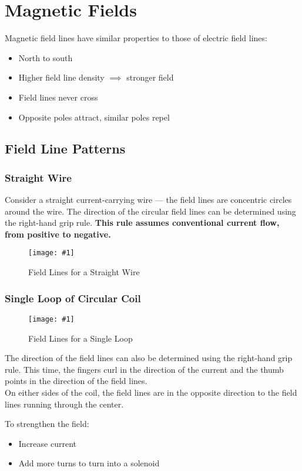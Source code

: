 \documentclass[a4paper,12pt]{article}
\let\oldsection\section
\renewcommand\section{\clearpage\oldsection}
\newcommand{\lb}{\\[8pt]}
\newcommand{\img}[4]{\begin{center}
  \begin{figure}[H]
    \centering
    \texttt{[image: \#1]}
    \caption{#3}
    \label{fig:#4}
  \end{figure}
\end{center}}
\begin{document}
\section{Magnetic Fields}

Magnetic field lines have similar properties to those of electric field lines:
\begin{itemize}
  \item North to south
  \item Higher field line density $\implies$ stronger field
  \item Field lines never cross
  \item Opposite poles attract, similar poles repel
\end{itemize}

\subsection{Field Line Patterns}

\subsubsection{Straight Wire}

Consider a straight current-carrying wire --- the field lines are concentric circles around the wire. The direction of the circular field lines can be determined using the right-hand grip rule. \textbf{This rule assumes conventional current flow, from positive to negative.}

\img{straightwire.jpg}{0.5}{Field Lines for a Straight Wire}{straightwire}

\subsubsection{Single Loop of Circular Coil}

\img{singleloop.png}{0.7}{Field Lines for a Single Loop}{singleloop}

The direction of the field lines can also be determined using the right-hand grip rule. This time, the fingers curl in the direction of the current and the thumb points in the direction of the field lines.\lb
On either sides of the coil, the field lines are in the opposite direction to the field lines running through the center.

To strengthen the field:
\begin{itemize}
  \item Increase current
  \item Add more turns to turn into a solenoid
\end{itemize}
\end{document}
